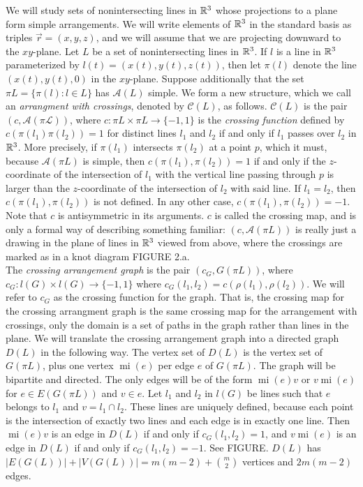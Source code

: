 \documentclass[11pt, oneside]{article}
\newcommand{\mi}{\operatorname{mi}}
\begin{document}
We will study sets of nonintersecting lines in $\mathbb{R}^3$ whose projections to a plane form simple arrangements. We will write elements of $\mathbb{R}^3$ in the standard basis as triples $\vec{r} = (x, y, z)$, and we will assume that we are projecting downward to the $xy$-plane. Let $L$ be a set of nonintersecting lines in $\mathbb{R}^3$. If $l$ is a line in $\mathbb{R}^3$ parameterized by $l(t) = (x(t), y(t), z(t))$, then let $\pi(l)$ denote the line $(x(t), y(t), 0)$ in the $xy$-plane. Suppose additionally that the set $\pi L = \{\pi(l): l \in L\}$ has $\mathcal{A}(L)$ simple. We form a new structure, which we call an \emph{arrangment with crossings}, denoted by $\mathcal{C}(L)$, as follows. $\mathcal{C}(L)$ is the pair $(c, \mathcal{A(\pi L)})$, where $c: \pi L \times \pi L \to \{-1, 1\}$ is the \emph{crossing function} defined by $c(\pi(l_1) \pi(l_2)) = 1$ for distinct lines $l_1$ and $l_2$ if and only if $l_1$ passes over $l_2$ in $\mathbb{R}^3$. More precisely, if $\pi(l_1)$ intersects $\pi(l_2)$ at a point $p$, which it must, because $\mathcal{A}(\pi L)$ is simple, then $c(\pi(l_1), \pi(l_2)) = 1$ if and only if the $z$-coordinate of the intersection of $l_1$ with the vertical line passing through $p$ is larger than the $z$-coordinate of the intersection of $l_2$ with said line. If $l_1 = l_2$, then $c(\pi(l_1), \pi(l_2))$ is not defined. In any other case, $c(\pi(l_1), \pi(l_2)) = -1$. Note that $c$ is antisymmetric in its arguments. $c$ is called the crossing map, and is only a formal way of describing something familiar: $(c, \mathcal{A}(\pi L))$ is really just a drawing in the plane of lines in $\mathbb{R}^3$ viewed from above, where the crossings are marked as in a knot diagram FIGURE 2.a. \\

The \emph{crossing arrangement graph} is the pair $(c_G, G(\pi L))$, where $c_G: l(G) \times l(G) \to \{-1,1\}$ where $c_G(l_1, l_2) = c(\rho(l_1), \rho(l_2))$. We will refer to $c_G$ as the crossing function for the graph. That is, the crossing map for the crossing arrangment graph is the same crossing map for the arrangement with crossings, only the domain is a set of paths in the graph rather than lines in the plane. We will translate the crossing arrangement graph into a directed graph $D(L)$ in the following way. The vertex set of $D(L)$ is the vertex set of $G(\pi L)$, plus one vertex $\mi(e)$ per edge $e$ of $G(\pi L)$. The graph will be bipartite and directed. The only edges will be of the form $\mi(e)v$ or $v \mi(e)$ for $e \in E(G(\pi L))$ and $v \in e$. Let $l_1$ and $l_2$ in $l(G)$ be lines such that $e$ belongs to $l_1$ and $v = l_1 \cap l_2$. These lines are uniquely defined, because each point is the intersection of exactly two lines and each edge is in exactly one line. Then $\mi(e)v$ is an edge in $D(L)$ if and only if $c_G(l_1, l_2) = 1$, and $v \mi(e)$ is an edge in $D(L)$ if and only if $c_G(l_1, l_2) = -1$. See FIGURE. $D(L)$ has $|E(G(L))| +  |V(G(L))| = m(m-2) + { m \choose 2}$ vertices and $2m(m-2)$ edges. \\
\end{document}

